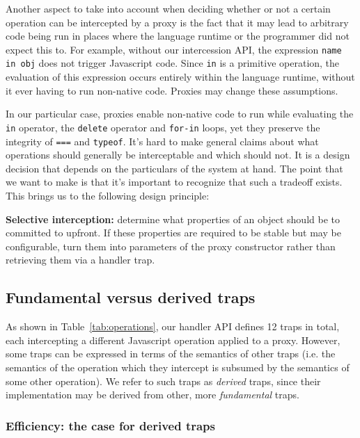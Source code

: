 \documentclass{sig-alternate}
\begin{document}
Another aspect to take into account when deciding whether or not a certain operation can be intercepted by a proxy is the fact that it may lead to arbitrary code being run in places where the language runtime or the programmer did not expect this to. For example, without our intercession API, the expression \texttt{name in obj} does not trigger Javascript code. Since \texttt{in} is a primitive operation, the evaluation of this expression occurs entirely within the language runtime, without it ever having to run non-native code. Proxies may change these assumptions.

In our particular case, proxies enable non-native code to run while evaluating the \texttt{in} operator, the \texttt{delete} operator and \texttt{for-in} loops, yet they preserve the integrity of \texttt{===} and \texttt{typeof}. It's hard to make general claims about what operations should generally be interceptable and which should not. It is a design decision that depends on the particulars of the system at hand. The point that we want to make is that it's important to recognize that such a tradeoff exists. This brings us to the following design principle:

\textbf{Selective interception:} determine what properties of an object should be to committed to upfront. If these properties are required to be stable but may be configurable, turn them into parameters of the proxy constructor rather than retrieving them via a handler trap.

\subsection{Fundamental versus derived traps}
\label{sub:fundamental_vs_derived_traps}

As shown in Table~\ref{tab:operations}, our handler API defines 12 traps in total, each intercepting a different Javascript operation applied to a proxy. However, some traps can be expressed in terms of the semantics of other traps (i.e. the semantics of the operation which they intercept is subsumed by the semantics of some other operation). We refer to such traps as \emph{derived} traps, since their implementation may be derived from other, more \emph{fundamental} traps.

\subsubsection{Efficiency: the case for derived traps}
\end{document}
